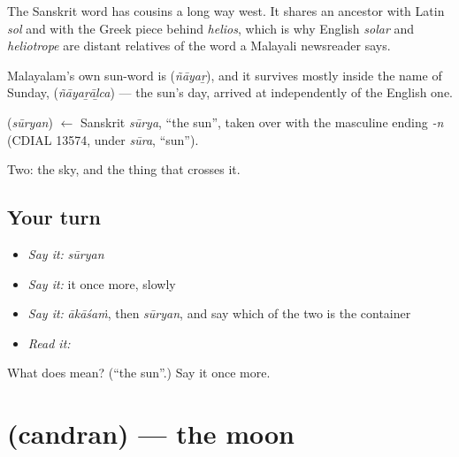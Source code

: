 The Sanskrit word has cousins a long way west. It shares an ancestor with Latin \emph{sol} and with the Greek piece behind \emph{helios}, which is why English \emph{solar} and \emph{heliotrope} are distant relatives of the word a Malayali newsreader says.

Malayalam's own sun-word is  (\emph{ñāyaṟ}), and it survives mostly inside the name of Sunday,  (\emph{ñāyaṟāḻca}) — the sun's day, arrived at independently of the English one.

\begin{cousinweb}
\textbf{} (\emph{sūryan}) $\leftarrow$ Sanskrit \emph{sūrya}, \textquotedblleft{}the sun\textquotedblright{}, taken over with the masculine ending \emph{-n} (CDIAL 13574, under \emph{sūra}, \textquotedblleft{}sun\textquotedblright{}).
\end{cousinweb}

\begin{grammarlens}[title={What you've built}]
Two: the sky, and the thing that crosses it.
\end{grammarlens}

\subsection*{Your turn}
\begin{itemize}
\raggedright
  \item \emph{Say it:} \emph{sūryan}
  \item \emph{Say it:} it once more, slowly
  \item \emph{Say it:} \emph{ākāśaṁ}, then \emph{sūryan}, and say which of the two is the container
  \item \emph{Read it:} \textbf{}
\end{itemize}

\begin{tcolorbox}[breakable,colback=teal!4,colframe=teal!35!black,title={Before you move on}]
What does  mean? (\textquotedblleft{}the sun\textquotedblright{}.) Say it once more.
\end{tcolorbox}
\section[\texorpdfstring{\ml{ചന്ദ്രൻ} (candran)}{ചന്ദ്രൻ (candran)}]{ (candran) — the moon}

\label{lesson:ML-C53-moon}



